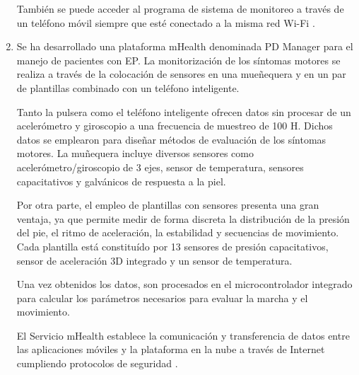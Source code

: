 \begin{enumerate}
    También se puede acceder al programa de sistema de monitoreo a través de un teléfono móvil siempre que esté conectado a la misma red Wi-Fi \cite{fadhlannisa2020design}. 
    
    \item Se ha desarrollado una plataforma mHealth denominada PD Manager para el manejo de pacientes con EP. La monitorización de los síntomas motores se realiza a través de la colocación de sensores en una mueñequera y en un par de plantillas combinado con un teléfono inteligente. 
    
    Tanto la pulsera como el teléfono inteligente ofrecen datos sin procesar de un acelerómetro y giroscopio a una frecuencia de muestreo de 100 H. Dichos datos se emplearon para diseñar métodos de evaluación de los síntomas motores. La muñequera incluye diversos sensores como acelerómetro/giroscopio de 3 ejes, sensor de temperatura, sensores capacitativos y galvánicos de respuesta a la piel. 
    
    Por otra parte, el empleo de plantillas con sensores presenta una gran ventaja, ya que permite medir de forma discreta la distribución de la presión del pie, el ritmo de aceleración, la estabilidad y secuencias de movimiento. Cada plantilla está constituído por 13 sensores de presión capacitativos, sensor de aceleración 3D integrado y un sensor de temperatura.

    Una vez obtenidos los datos, son procesados en el microcontrolador integrado para calcular los parámetros necesarios para evaluar la marcha y el movimiento.

    El Servicio mHealth establece la comunicación y transferencia de datos entre las aplicaciones móviles y la plataforma en la nube a través de Internet cumpliendo protocolos de seguridad \cite{gatsios2020feasibility}.
\end{enumerate}




